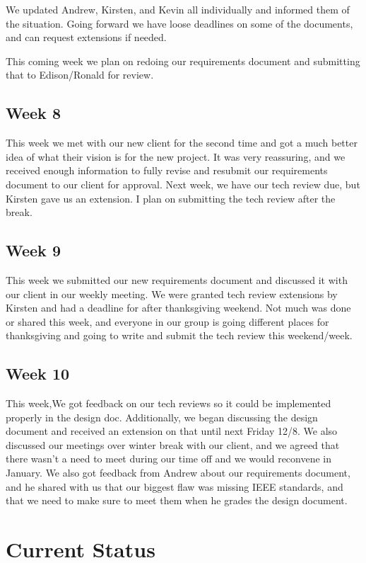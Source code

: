 \documentclass[letterpaper,10pt,titlepage,journal,compsoc,draftclsnofoot,onecolumn]{IEEEtran}
\begin{document}
        We updated Andrew, Kirsten, and Kevin all individually and informed them of the situation. Going forward we have loose deadlines on some of the documents, and can request extensions if needed. 
 
        This coming week we plan on redoing our requirements document and submitting that to Edison/Ronald for review. 
    
    \subsection{Week 8}
        This week we met with our new client for the second time and got a much better idea of what their vision is for the new project. It was very reassuring, and we received enough information to fully revise and resubmit our requirements document to our client for approval. Next week, we have our tech review due, but Kirsten gave us an extension. I plan on submitting the tech review after the break. 

            
    \subsection{Week 9}
        This week we submitted our new requirements document and discussed it with our client in our weekly meeting. We were granted tech review extensions by Kirsten and had a deadline for after thanksgiving weekend. Not much was done or shared this week, and everyone in our group is going different places for thanksgiving and going to write and submit the tech review this weekend/week. 

            
            
    \subsection{Week 10}
        This week,We got feedback on our tech reviews so it could be implemented properly in the design doc. Additionally, we began discussing the design document and received an extension on that until next Friday 12/8. We also discussed our meetings over winter break with our client, and we agreed that there wasn't a need to meet during our time off and we would reconvene in January. We also got feedback from Andrew about our requirements document, and he shared with us that our biggest flaw was missing IEEE standards, and that we need to make sure to meet them when he grades the design document. 

\section{Current Status}
\end{document}
